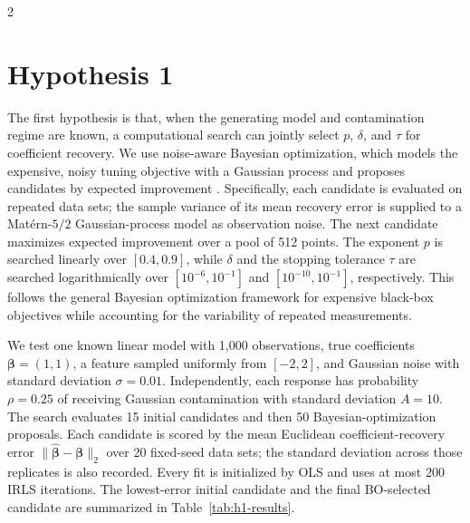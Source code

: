 \documentclass[10pt,a4paper]{article}
\begin{document}
\begin{multicols}{2}
\section{Hypothesis 1}
\label{sec:H1}

The first hypothesis is that, when the generating model and contamination
regime are known, a computational search can jointly select $p$, $\delta$,
and $\tau$ for coefficient recovery. We use noise-aware Bayesian
optimization, which models the expensive, noisy tuning objective with a
Gaussian process and proposes candidates by expected improvement
\cite{jones1998,snoek2012}. Specifically, each candidate is evaluated on
repeated data sets; the sample variance of its mean recovery error is supplied
to a Mat\'ern-$5/2$ Gaussian-process model as observation noise. The next
candidate maximizes expected improvement over a pool of 512 points. The
exponent $p$ is searched linearly over $[0.4,0.9]$, while $\delta$ and the
stopping tolerance $\tau$ are searched logarithmically over $[10^{-6},10^{-1}]$
and $[10^{-10},10^{-1}]$, respectively. This follows the general Bayesian
optimization framework for expensive black-box objectives while accounting
for the variability of repeated measurements.

We test one known linear model with 1,000 observations, true coefficients
$\boldsymbol{\beta}=(1,1)$, a feature sampled uniformly from $[-2,2]$, and
Gaussian noise with standard deviation $\sigma=0.01$. Independently, each
response has probability $\rho=0.25$ of receiving Gaussian contamination
with standard deviation $A=10$. The search evaluates 15 initial candidates
and then 50 Bayesian-optimization proposals. Each candidate is scored by the
mean Euclidean coefficient-recovery error
$\|\hat{\boldsymbol{\beta}}-\boldsymbol{\beta}\|_2$ over 20 fixed-seed data
sets; the standard deviation across those replicates is also recorded.
Every fit is initialized by OLS and uses at most 200 IRLS iterations. The
lowest-error initial candidate and the final BO-selected candidate are
summarized in Table~\ref{tab:h1-results}.

\begin{table}[H]
  \centering
  \caption{Hypothesis 1 tuning results. Errors are mean $\pm$ standard
  deviation over 20 replicates.}
  \label{tab:h1-results}
  \scriptsize
\end{table}


\end{multicols}
\end{document}
